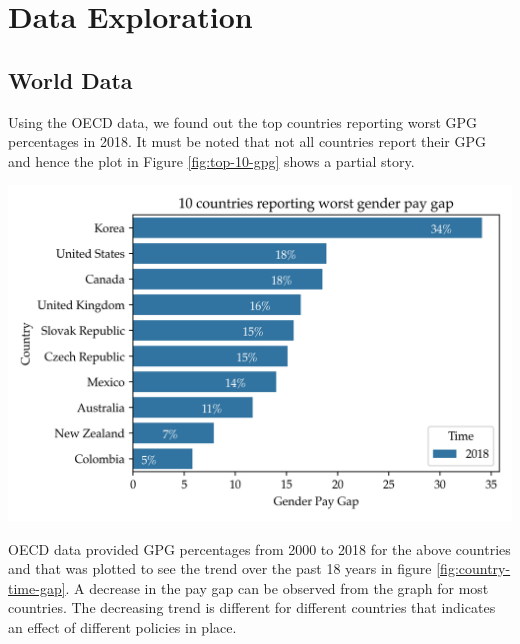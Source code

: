 \section{Data Exploration}

\subsection{World Data}

Using the OECD data, we found out the top countries reporting worst GPG percentages in 2018. It must be noted that not all countries report their GPG and hence the plot in Figure \ref{fig:top-10-gpg} shows a partial story.

    \begin{centering}
        \includegraphics[width=0.99\linewidth]{images/Top10Countries.png}
        \label{fig:top-10-gpg}
    \end{centering}
    
OECD data provided GPG percentages from 2000 to 2018 for the above countries and that was plotted to see the trend over the past 18 years in figure \ref{fig:country-time-gap}. A decrease in the pay gap can be observed from the graph for most countries. The decreasing trend is different for different countries that indicates an effect of different policies in place.

